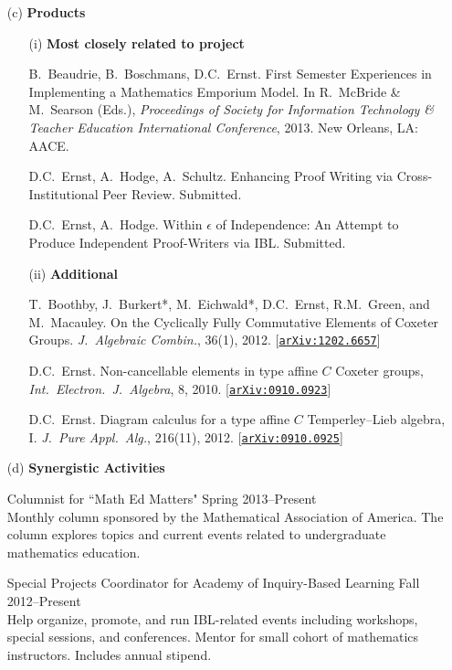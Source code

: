 \documentclass[11pt]{article}
\begin{document}
\begin{enumerate}[leftmargin=*]
\item[(c)] \textbf{Products}

\begin{enumerate}[leftmargin=\parindent]
\item[(i)] \textbf{Most closely related to project}

B.~Beaudrie, B.~Boschmans, D.C.~Ernst. First Semester Experiences in Implementing a Mathematics Emporium Model. In R.~McBride \& M.~Searson (Eds.), \emph{Proceedings of Society for Information Technology \& Teacher Education International Conference}, 2013.  New Orleans, LA: AACE.

\smallskip

D.C.~Ernst, A.~Hodge, A.~Schultz.  Enhancing Proof Writing via Cross-Institutional Peer Review. Submitted.

\smallskip

D.C.~Ernst, A.~Hodge. Within $\epsilon$ of Independence: An Attempt to Produce Independent Proof-Writers via IBL. Submitted.
 
\item[(ii)] \textbf{Additional}

T.~Boothby, J.~Burkert*, M.~Eichwald*, D.C.~Ernst, R.M.~Green, and M.~Macauley. On the Cyclically Fully Commutative Elements of Coxeter Groups.  \emph{J.~Algebraic Combin.}, 36(1), 2012.  [\href{http://arxiv.org/abs/1202.6657}{\texttt{arXiv:1202.6657}}]

\smallskip

\noindent D.C.~Ernst.  Non-cancellable elements in type affine $C$ Coxeter groups,  \emph{Int.~Electron.~J.~Algebra}, 8, 2010.  [\href{http://arxiv.org/abs/0910.0923}{\texttt{arXiv:0910.0923}}]

\smallskip

D.C.~Ernst.  Diagram calculus for a type affine $C$ Temperley--Lieb algebra, I. \emph{J.~Pure Appl.~Alg.}, 216(11), 2012. [\href{http://arxiv.org/abs/0910.0925}{\texttt{arXiv:0910.0925}}]
\end{enumerate}
 
\item[(d)] \textbf{Synergistic Activities}

Columnist for ``Math Ed Matters" \hfill Spring 2013--Present\\
Monthly column sponsored by the Mathematical Association of America. The column explores topics and current events related to undergraduate mathematics education. 

\smallskip

Special Projects Coordinator for Academy of Inquiry-Based Learning \hfill Fall 2012--Present\\
Help organize, promote, and run IBL-related events including workshops, special sessions, and conferences. Mentor for small cohort of mathematics instructors.  Includes annual stipend.


\end{enumerate}
\end{document}
